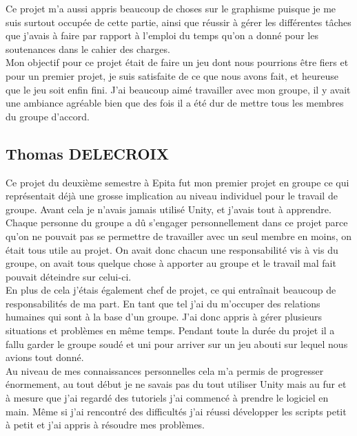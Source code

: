 \documentclass[a4paper , 12pt]{article}
\begin{document}
Ce projet m’a aussi appris beaucoup de choses sur le graphisme puisque je me suis surtout occupée de cette partie, ainsi que réussir à gérer les différentes tâches que j’avais à faire par rapport à l’emploi du temps qu’on a donné pour les soutenances dans le cahier des charges.\\

 Mon objectif pour ce projet était de faire un jeu dont nous pourrions être fiers et pour un premier projet, je suis satisfaite de ce que nous avons fait, et heureuse que le jeu soit enfin fini. J’ai beaucoup aimé travailler avec mon groupe, il y avait une ambiance agréable bien que des fois il a été dur de mettre tous les membres du groupe d’accord. 

\newpage

\subsection{Thomas DELECROIX}

\quad


Ce projet du deuxième semestre à Epita fut mon premier projet en groupe ce qui représentait déjà une grosse implication au niveau individuel pour le travail de groupe. Avant cela je n’avais jamais utilisé Unity, et j’avais tout à apprendre. Chaque personne du groupe a dû s’engager personnellement dans ce projet parce qu’on ne pouvait pas se permettre de travailler avec un seul membre en moins, on était tous utile au projet. On avait donc chacun une responsabilité vis à vis du groupe, on avait tous quelque chose à apporter au groupe et le travail mal fait pouvait déteindre sur celui-ci.\\

En plus de cela j’étais également chef de projet, ce qui entraînait beaucoup de responsabilités de ma part. En tant que tel j’ai du m’occuper des relations humaines qui sont à la base d’un groupe. J’ai donc appris à gérer plusieurs situations et problèmes en même temps. Pendant toute la durée du projet il a fallu garder le groupe soudé et uni pour arriver sur un jeu abouti sur lequel nous avions tout donné.\\

Au niveau de mes connaissances personnelles cela m’a permis de progresser énormement, au tout début je ne savais pas du tout utiliser Unity mais au fur et à mesure que j’ai regardé des tutoriels j’ai commencé à prendre le logiciel en main. Même si j’ai rencontré des difficultés j’ai réussi développer les scripts petit à petit et j’ai appris à résoudre mes problèmes.\\
\end{document}

